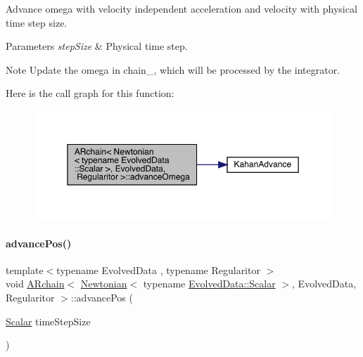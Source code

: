 Advance omega with velocity independent acceleration and velocity with physical time step size. 
\begin{DoxyParams}{Parameters}
{\em step\+Size} & Physical time step. \\
\hline
\end{DoxyParams}
\begin{DoxyNote}{Note}
Update the omega in chain_, which will be processed by the integrator.
\end{DoxyNote}
Here is the call graph for this function\+:\nopagebreak
\begin{figure}[H]
\begin{center}
\leavevmode
\includegraphics[width=350pt]{class_a_rchain_3_01_newtonian_3_01typename_01_evolved_data_1_1_scalar_01_4_00_01_evolved_data_00_01_regularitor_01_4_a8427d55e9b05fca4a1db2b9024940e06_cgraph}
\end{center}
\end{figure}
\mbox{\label{class_a_rchain_3_01_newtonian_3_01typename_01_evolved_data_1_1_scalar_01_4_00_01_evolved_data_00_01_regularitor_01_4_adffd5a74134d2a87e4f07908ea5beef4}} 
\paragraph{\texorpdfstring{advance\+Pos()}{advancePos()}}
{\footnotesize\ttfamily template$<$typename Evolved\+Data , typename Regularitor $>$ \\
void \mbox{\hyperlink{class_a_rchain}{A\+Rchain}}$<$ \mbox{\hyperlink{class_newtonian}{Newtonian}}$<$ typename \mbox{\hyperlink{class_a_rchain_a707e42a79e4744424a34c9007e84ee07}{Evolved\+Data\+::\+Scalar}} $>$, Evolved\+Data, Regularitor $>$\+::advance\+Pos (\begin{DoxyParamCaption}\item[{\mbox{\hyperlink{class_a_rchain_3_01_newtonian_3_01typename_01_evolved_data_1_1_scalar_01_4_00_01_evolved_data_00_01_regularitor_01_4_a2c77dc1b58a25ac5c6ee95dd7809f693}{Scalar}}}]{time\+Step\+Size }\end{DoxyParamCaption})}



